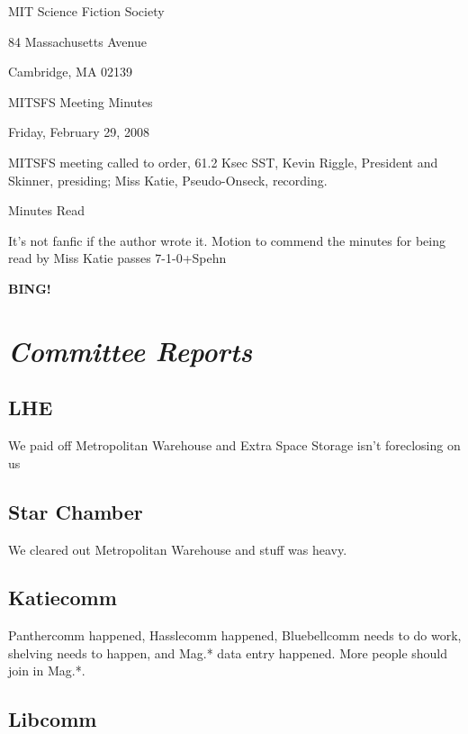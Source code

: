 \documentclass[10pt]{article}
\newcommand{\bing}{{\bf BING!} }
\newcommand{\goto}[1]{\bing \vskip 12pt \section*{{\em{#1}}}}
\begin{document}
\begin{center}

MIT Science Fiction Society

84 Massachusetts Avenue

Cambridge, MA 02139

\vspace{12pt}

MITSFS Meeting Minutes

Friday, February 29, 2008

\end{center}

\vspace{18pt}

\setlength{\parskip}{6pt}

\noindent
MITSFS meeting called to order, 61.2 Ksec SST,
Kevin Riggle, President and Skinner, presiding; Miss Katie, Pseudo-Onseck, recording.

Minutes Read

It's not fanfic if the author wrote it.  
Motion to commend the minutes for being read by Miss Katie passes 7-1-0+Spehn

\BING

\goto{Committee Reports}

\subsection{LHE}

We paid off Metropolitan Warehouse and Extra Space Storage isn't foreclosing on us

\subsection{Star Chamber}

We cleared out Metropolitan Warehouse and stuff was heavy.

\subsection{Katiecomm}

Panthercomm happened, Hasslecomm happened, Bluebellcomm needs to do work, shelving needs to happen, and Mag.* data entry happened.  More people should join in Mag.*.

\subsection{Libcomm}
\end{document}
